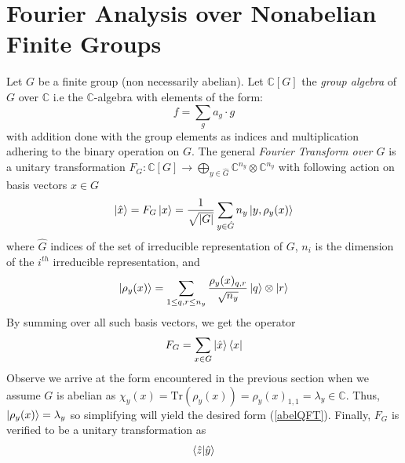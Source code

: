 \section{Fourier Analysis over Nonabelian Finite Groups}

Let $G$ be a finite group (non necessarily abelian).
Let $\mathbb{C}[G]$ the \textit{group algebra} of $G$ over $\mathbb{C}$ i.e the $\mathbb{C}$-algebra with elements of the form:
$$ f = \sum_g a_g \cdot g $$ with addition done with the group elements as indices and multiplication adhering to the binary operation on $G$. The general \textit{Fourier Transform over $G$} is a unitary transformation $F_G: \mathbb{C}[G] \rightarrow \bigoplus_{y \in \hat{G}} \mathbb{C}^{n_y} \otimes \mathbb{C}^{n_y}$ with following action on basis vectors $x \in G$
%
\begin{equation}
  \ket{\hat{x}} = F_G\ket{x} = \frac{1}{\sqrt{|G|}}\sum_{y \in \hat{G}} n_y \ket{y, \rho_y(x)}
\end{equation}
where $\hat{G}$ indices of the set of irreducible representation of $G$, $n_i$ is the dimension of the $i^{th}$ irreducible representation, and
\begin{equation}
  \ket{\rho_y(x)} = \sum_{1 \leq q,r \leq n_y} \frac{\rho_y(x)_{q,r}}{\sqrt{n_y}} \ket{q} \otimes \ket{r}
\end{equation}
%
By summing over all such basis vectors, we get the operator
$$ F_G = \sum_{x \in G} \ket{\hat{x}}\bra{x} $$
%
Observe we arrive at the form encountered in the previous section when we assume $G$ is abelian as $\chi_y(x) = \text{Tr}(\rho_y(x)) = \rho_y(x)_{1,1} = \lambda_y \in \mathbb{C}$. Thus, $\ket{\rho_y(x)} = \lambda_y$ so simplifying will yield the desired form (\ref{abelQFT}).
%
Finally, $F_G$ is verified to be a unitary transformation as
\begin{gather}
  \bra{\hat{z}}\ket{\hat{y}}
\end{gather}
